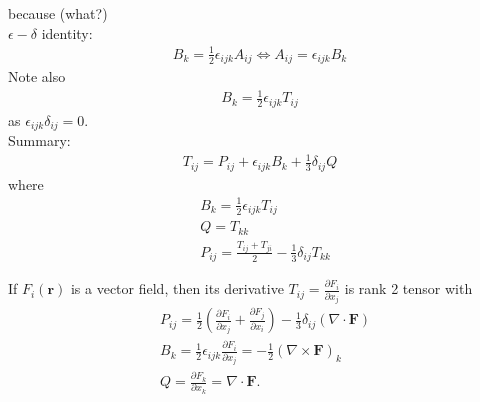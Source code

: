 \documentclass[a4paper]{article}
\begin{document}
because (what?)\\
$\epsilon-\delta$ identity:
\begin{equation*}
\begin{aligned}
B_k = \frac{1}{2} \epsilon_{ijk} A_{ij} \iff A_{ij} = \epsilon_{ijk} B_k
\end{aligned}
\end{equation*}
Note also
\begin{equation*}
\begin{aligned}
B_k = \frac{1}{2}\epsilon_{ijk} T_{ij}
\end{aligned}
\end{equation*}
as $\epsilon_{ijk} \delta_{ij} = 0$.\\
Summary:
\begin{equation*}
\begin{aligned}
T_{ij} = P_{ij} + \epsilon_{ijk} B_k + \frac{1}{3}\delta_{ij} Q
\end{aligned}
\end{equation*}
where
\begin{equation*}
\begin{aligned}
&B_k = \frac{1}{2}\epsilon_{ijk} T_{ij}\\
&Q = T_{kk}\\
&P_{ij} = \frac{T_{ij} + T_{ji}}{2} - \frac{1}{3} \delta_{ij} T_{kk}
\end{aligned}
\end{equation*}

\begin{eg}
If $F_i\left(\mathbf{r}\right)$ is a vector field, then its derivative $T_{ij} = \frac{\partial F_i}{\partial x_j}$ is rank 2 tensor with
\begin{equation*}
\begin{aligned}
&P_{ij} = \frac{1}{2}\left(\frac{\partial F_i}{\partial x_j} + \frac{\partial F_j}{\partial x_i}\right) - \frac{1}{3}\delta_{ij} \left(\nabla\cdot\mathbf{F}\right)\\
&B_k = \frac{1}{2}\epsilon_{ijk} \frac{\partial F_i}{\partial x_j} = -\frac{1}{2} \left(\nabla\times\mathbf{F}\right)_k\\
&Q = \frac{\partial F_k}{\partial x_k} = \nabla\cdot\mathbf{F}.
\end{aligned}
\end{equation*}
\end{eg}
\end{document}
